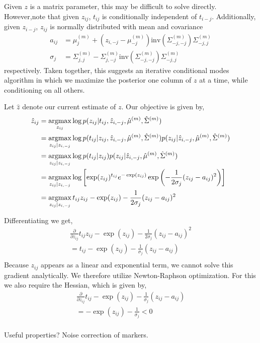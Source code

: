 \documentclass[10pt]{article}
\newcommand{\argmax}{\operatornamewithlimits{argmax}}
\begin{document}
Given $z$ is a matrix parameter, this may be difficult to solve directly. However,note that given $z_{ij}$, $t_{ij}$ is conditionally independent of $t_{i-j}$. Additionally, given $z_{i-j}$, $z_{ij}$ is normally distributed with mean and covariance 
\begin{align*}
a_{ij} & = \mu^{(m)}_j + \left(z_{i,-j} - \mu^{(m)}_{-j} \right)\textrm{inv}\left( \Sigma^{(m)}_{-j,-j} \right) \Sigma^{(m)}_{-j,j} \\
\sigma_j &= \Sigma^{(m)}_{j,j} - \Sigma^{(m)}_{j,-j}\textrm{inv}\left( \Sigma^{(m)}_{-j,-j} \right) \Sigma^{(m)}_{-j,j}
\end{align*}
respectively. Taken together, this suggests an iterative conditional modes algorithm in which we maximize the posterior one column of $z$ at a time, while conditioning on all others. 

Let $\hat{z}$ denote our current estimate of $z$. Our objective is given by,
\begin{align*}
\hat{z}_{ij} & = \argmax_{z_{ij}} \log p(z_{ij} | t_{ij}, \hat{z}_{i,-j}, \hat{\mu}^{(m)}, \hat{\Sigma}^{(m)}) \\
& = \argmax_{z_{ij} | z_{i,-j} } \log p(t_{ij} | z_{ij}, \hat{z}_{i,-j}, \hat{\mu}^{(m)}, \hat{\Sigma}^{(m)})p(z_{ij} | \hat{z}_{i,-j}, \hat{\mu}^{(m)}, \hat{\Sigma}^{(m)})  \\
& = \argmax_{z_{ij} | z_{i,-j} } \log p(t_{ij} | z_{ij})p(z_{ij} | \hat{z}_{i,-j}, \hat{\mu}^{(m)}, \hat{\Sigma}^{(m)})  \\
& = \argmax_{z_{ij} | z_{i,-j} } \log \left[ \exp(z_{ij})^{t_{ij}}  e^{-\exp(z_{ij})} \exp \left( -\frac{1}{2\sigma_j}(z_{ij} - a_{ij})^2 \right) \right] \\
& = \argmax_{z_{ij} | z_{i,-j} }  t_{ij}z_{ij} -\exp(z_{ij})  -\frac{1}{2\sigma_j}(z_{ij} - a_{ij})^2 
\end{align*}

Differentiating we get,
\begin{align*}
\frac{\partial}{\partial z_{ij}}  t_{ij}z_{ij} -\exp(z_{ij})  -\frac{1}{2\sigma_j}(z_{ij} - a_{ij})^2 \\ 
= t_{ij} - \exp(z_{ij})  -\frac{1}{\sigma_j}(z_{ij} - a_{ij}) \\ 
\end{align*}
Because $z_{ij}$ appears as a linear and exponential term, we cannot solve this gradient analytically. We therefore utilize Newton-Raphson optimization. For this we also require the Hessian, which is given by,  
\begin{align*}
\frac{\partial}{\partial z_{ij}} t_{ij} - \exp(z_{ij})  -\frac{1}{\sigma_j}(z_{ij} - a_{ij}) \\ 
=  -\exp(z_{ij})  - \frac{1}{\sigma_j} < 0\\ 
\end{align*}

Useful properties? Noise correction of markers.
\end{document}
